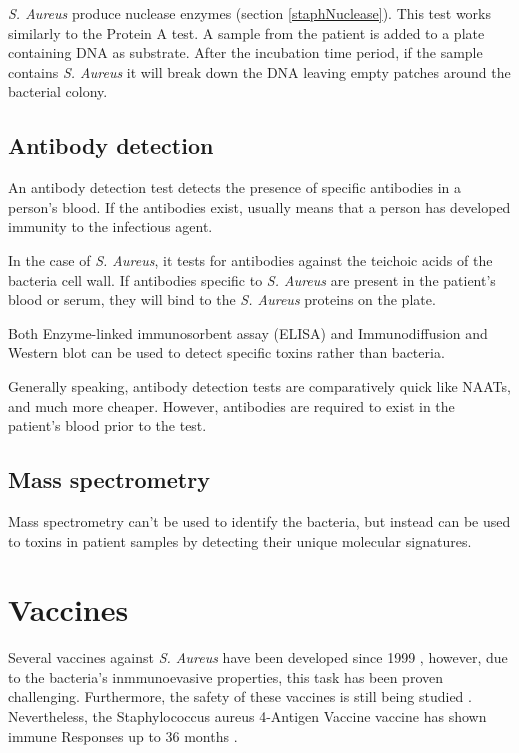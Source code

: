 \textit{S. Aureus} produce nuclease enzymes (section \ref{staphNuclease}). This test works similarly to the Protein A test. A sample from the patient is added to a plate containing DNA as substrate. After the incubation time period, if the sample contains \textit{S. Aureus} it will break down the DNA leaving empty patches around the bacterial colony.

\subsection{Antibody detection}

An antibody detection test detects the presence of specific antibodies in a person's blood. If the antibodies exist, usually means that a person has developed immunity to the infectious agent.

In the case of \textit{S. Aureus}, it tests for antibodies against the teichoic acids of the bacteria cell wall. If antibodies specific to \textit{S. Aureus} are present in the patient's blood or serum, they will bind to the \textit{S. Aureus} proteins on the plate.

Both Enzyme-linked immunosorbent assay (ELISA) and Immunodiffusion and Western blot can be used to detect specific toxins rather than bacteria.

Generally speaking, antibody detection tests are comparatively quick like NAATs, and much more cheaper. However, antibodies are required to exist in the patient's blood prior to the test.

\subsection{Mass spectrometry}

Mass spectrometry can't be used to identify the bacteria, but instead can be used to toxins in patient samples by detecting their unique molecular signatures.

\section{Vaccines}

Several vaccines against \textit{S. Aureus} have been developed since 1999 \cite{Parastan2020}, however, due to the bacteria's inmmunoevasive properties, this task has been proven challenging. Furthermore, the safety of these vaccines is still being studied \cite{Xu2017}. Nevertheless, the Staphylococcus aureus 4-Antigen Vaccine vaccine has shown immune Responses up to 36 months \cite{Creech2019}.







